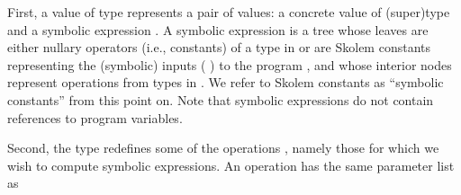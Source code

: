 ﻿\documentclass{IOS-Book-Article}
\begin{document}
\begin{mdUl}[class={ul,list-star,loose},elem={ul},data-line={357}]%
\begin{mdLi}[class={li,ul-li,list-star-li,loose-li},label={[(1)]\{.ul-li-label\}},elem={li},data-line={357}]%
\begin{mdP}[data-line={357}]%
{}First, a value of type %
{}%
{} represents a pair of values: 
a concrete value %
{}%
{} of (super)type %
{}%
{} and a symbolic expression %
{}%
{}. 
A symbolic expression is a tree
whose leaves are either nullary operators (i.e., constants) of a type in %
{}%
{}
or are Skolem constants representing the (symbolic) inputs (%
{}%
{})
to the program %
{}%
{}, and whose interior nodes represent operations 
from types in %
{}%
{}. We refer to Skolem constants as %
{}{\textquotedblleft}symbolic constants{\textquotedblright}%
{}
from this point on. Note that symbolic expressions do not contain
references to program variables.%
\end{mdP}%
\end{mdLi}%
\begin{mdLi}[class={li,ul-li,list-star-li,loose-li},label={[(2)]\{.ul-li-label\}},elem={li},data-line={367}]%
\begin{mdP}[data-line={367}]%
{}Second, the type %
{}%
{} redefines some of the operations %
{}%
{},
namely those for which we wish to compute symbolic expressions.
An operation %
{}%
{} has the same parameter list as %
{}%

\end{mdP}
\end{mdLi}
\end{mdUl}
\end{document}
